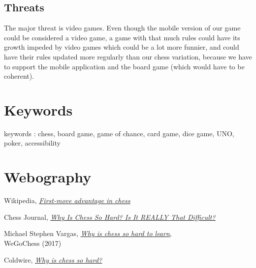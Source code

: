 \documentclass[12pt]{article}
\begin{document}
        \subsection{Threats} 
            The major threat is video games. Even though the mobile version of our game could be considered a video game, a game with that much rules could have its growth impeded by video games which could be a lot more funnier, and could have their rules updated more regularly than our chess variation, because we have to support the mobile application and the board game (which would have to be coherent).

    \section{Keywords}
        keywords : chess, board game, game of chance, card game, dice game, UNO, poker, accessibility
    
    \section{Webography}
        \begin{thebibliography}{9}
                Wikipedia, \textit{\href{https://en.wikipedia.org/wiki/First-move_advantage_in_chess}{\underline{First-move advantage in chess}} }
                
                Chess Journal, \textit{\href{https://www.chessjournal.com/why-is-chess-so-hard/}{\underline{Why Is Chess So Hard? Is It REALLY That Difficult?}} }
            
                Michael Stephen Vargas, \href{
        https://wegochess.com/why-is-chess-so-hard-to-learn/}{\underline{\textit{Why is chess so hard to learn}}},
                \\WeGoChess (2017)
            
                Coldwire,
                \href{https://www.thecoldwire.com/why-is-chess-so-hard/}{\underline{\textit{Why is chess so hard?}}}
        \end{thebibliography}
    
\end{document}

